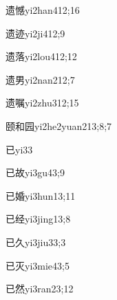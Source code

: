 \begin{verbete}{遗憾}{yi2han4}{12;16}
\end{verbete}

\begin{verbete}{遗迹}{yi2ji4}{12;9}
\end{verbete}

\begin{verbete}{遗落}{yi2lou4}{12;12}
\end{verbete}

\begin{verbete}{遗男}{yi2nan2}{12;7}
\end{verbete}

\begin{verbete}{遗嘱}{yi2zhu3}{12;15}
\end{verbete}

\begin{verbete}{颐和园}{yi2he2yuan2}{13;8;7}
\end{verbete}

\begin{verbete}{已}{yi3}{3}
\end{verbete}

\begin{verbete}{已故}{yi3gu4}{3;9}
\end{verbete}

\begin{verbete}{已婚}{yi3hun1}{3;11}
\end{verbete}

\begin{verbete}{已经}{yi3jing1}{3;8}
\end{verbete}

\begin{verbete}{已久}{yi3jiu3}{3;3}
\end{verbete}

\begin{verbete}{已灭}{yi3mie4}{3;5}
\end{verbete}

\begin{verbete}{已然}{yi3ran2}{3;12}
\end{verbete}

